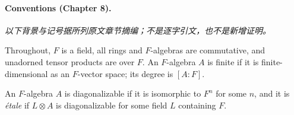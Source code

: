 \paragraph{Conventions (Chapter 8).}
\noindent\textit{以下背景与记号据所列原文章节摘编；不是逐字引文，也不是新增证明。}\par
Throughout, $F$ is a field, all rings and $F$-algebras are commutative, and unadorned tensor products are over $F$. An $F$-algebra $A$ is finite if it is finite-dimensional as an $F$-vector space; its degree is $[A:F]$.
\begin{definition}[8.5]
An $F$-algebra $A$ is diagonalizable if it is isomorphic to $F^n$ for some $n$, and it is \emph{\'etale} if $L\otimes A$ is diagonalizable for some field $L$ containing $F$.
\end{definition}

